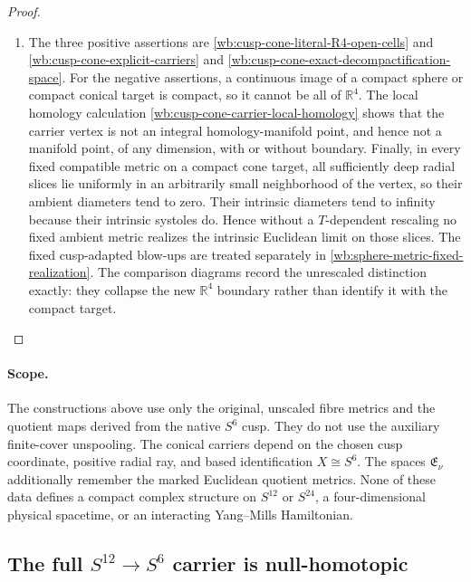 \begin{proof}
\begin{enumerate}[label=\arabic*.,leftmargin=*]
\item The three positive assertions are
\cref{wb:cusp-cone-literal-R4-open-cells} and \cref{wb:cusp-cone-explicit-carriers} and \cref{wb:cusp-cone-exact-decompactification-space}.
For the negative assertions, a continuous image of a compact sphere or
compact conical target is compact, so it cannot be all of \(\mathbb R^4\).
The local homology calculation
\cref{wb:cusp-cone-carrier-local-homology} shows that the carrier vertex is not
an integral homology-manifold point, and hence not a manifold point, of any
dimension, with or without boundary.  Finally, in every fixed compatible
metric on a compact cone target, all sufficiently deep radial slices lie
uniformly in an arbitrarily small neighborhood of the vertex, so their ambient
diameters tend to zero.  Their intrinsic diameters tend to infinity because
their intrinsic systoles do.  Hence without a \(T\)-dependent rescaling no
fixed ambient metric realizes the intrinsic Euclidean limit on those slices.
The fixed cusp-adapted blow-ups are treated separately in
\cref{wb:sphere-metric-fixed-realization}.  The comparison diagrams record the
unrescaled distinction exactly: they collapse the new \(\mathbb R^4\)
boundary rather than identify it with the compact target.
\end{enumerate}
\end{proof}

\paragraph{Scope.}
The constructions above use only the original, unscaled fibre metrics and
the quotient maps derived from the native \(S^6\) cusp.  They do not use the
auxiliary finite-cover unspooling.  The conical carriers depend on the
chosen cusp coordinate, positive radial ray, and based identification
\(X\cong S^6\).  The spaces \(\mathfrak E_\nu\) additionally remember the
marked Euclidean quotient metrics.  None of these data defines a compact
complex structure on \(S^{12}\) or \(S^{24}\), a four-dimensional physical
spacetime, or an interacting Yang--Mills Hamiltonian.

\subsection{The full \texorpdfstring{\(S^{12}\to S^6\)}{S12-to-S6}
carrier is null-homotopic}
\label{wb:cusp-s12-carrier-homotopy}

